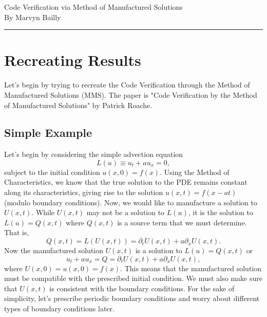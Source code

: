 \documentclass[12pt]{report}
\begin{document}
\large
\begin{center}
Code Verification via Method of Manufactured Solutions\\
By Marvyn Bailly \\
\end{center}
\normalsize
\hrule



\section{Recreating Results}
Let's begin by trying to recreate the Code Verification through the Method of Manufactured Solutions (MMS). The paper is "Code Verification by the Method of Manufactured Solutions" by Patrick Roache.

\subsection{Simple Example}
Let's begin by considering the simple advection equation
\begin{equation}\label{trans}
L(u) \equiv u_t + au_x = 0,
\end{equation}
subject to the initial condition $u(x,0) = f(x)$. Using the Method of Characteristics, we know that the true solution to the PDE remains constant along its characteristics, giving rise to the solution $u(x,t) = f(x - at)$ (modulo boundary conditions). Now, we would like to manufacture a solution to $U(x,t)$. While $U(x,t)$ may not be a solution to $L(u)$, it is the solution to $L(u) = Q(x,t)$ where $Q(x,t)$ is a source term that we must determine. That is,
\begin{equation}\label{manufactured}
Q(x,t) = L(U(x,t)) = \partial_t U(x,t) + a \partial_x U(x,t).
\end{equation}
Now the manufactured solution $U(x,t)$ is a solution to $L(u) = Q(x,t)$ or
\begin{equation}\label{trans-man}
    u_t + au_x = Q = \partial_t U(x,t) + a \partial_x U(x,t),
\end{equation}
where $U(x,0) = u(x,0) = f(x)$. This means that the manufactured solution must be compatible with the prescribed initial condition. We must also make sure that $U(x,t)$ is consistent with the boundary conditions. For the sake of simplicity, let's prescribe periodic boundary conditions and worry about different types of boundary conditions later.  
\end{document}
